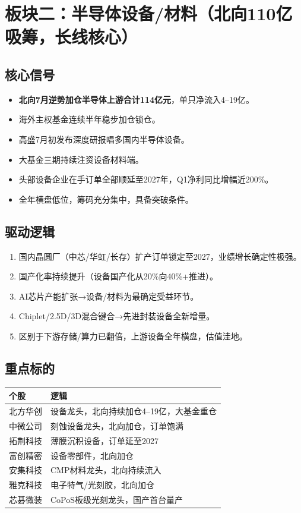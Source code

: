 \documentclass[a4paper,11pt,fontset=none]{ctexart}
\begin{document}
\section{板块二：半导体设备/材料（北向110亿吸筹，长线核心）}

\subsection*{核心信号}
\begin{itemize}
  \item \textbf{北向7月逆势加仓半导体上游合计114亿元}，单只净流入4--19亿。
  \item 海外主权基金连续半年稳步加仓锁仓。
  \item 高盛7月初发布深度研报唱多国内半导体设备。
  \item 大基金三期持续注资设备材料端。
  \item 头部设备企业在手订单全部顺延至2027年，Q1净利同比增幅近200\%。
  \item 全年横盘低位，筹码充分集中，具备突破条件。
\end{itemize}

\subsection*{驱动逻辑}
\begin{enumerate}
  \item 国内晶圆厂（中芯/华虹/长存）扩产订单锁定至2027，业绩增长确定性极强。
  \item 国产化率持续提升（设备国产化从20\%向40\%+推进）。
  \item AI芯片产能扩张→设备/材料为最确定受益环节。
  \item Chiplet/2.5D/3D混合键合→先进封装设备全新增量。
  \item 区别于下游存储/算力已翻倍，上游设备全年横盘，估值洼地。
\end{enumerate}

\subsection*{重点标的}
\begin{tabularx}{\textwidth}{L{3cm}X}
\toprule
\textbf{个股} & \textbf{逻辑} \\
\midrule
北方华创 & 设备龙头，北向持续加仓4--19亿，大基金重仓 \\
中微公司 & 刻蚀设备龙头，北向加仓，订单饱满 \\
拓荆科技 & 薄膜沉积设备，订单延至2027 \\
富创精密 & 设备零部件，北向加仓 \\
安集科技 & CMP材料龙头，北向持续流入 \\
雅克科技 & 电子特气/光刻胶，北向加仓 \\
芯碁微装 & CoPoS板级光刻龙头，国产首台量产 \\
\bottomrule
\end{tabularx}
\end{document}

